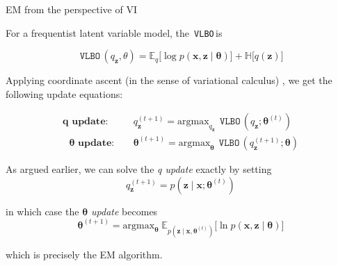 \documentclass[10pt]{beamer}
\newcommand{\+}[1]{\ensuremath{{\boldsymbol #1}}} %
\newcommand{\cond}{\; | \;}
\newcommand{\E}{\mathbb{E}}
\newcommand{\VLBO}{\,\texttt{VLBO}\,}
\begin{document}
\begin{frame}{EM from the perspective of VI}

 
 
For a frequentist latent variable model, the \VLBO is 

\begin{equation*} 
\VLBO(q_\+z, \theta) = \E_q \big[ \log p(\+x, \+z \cond \+\theta) \big]  +  \mathbb{H} \big[q(\+z) \big]  %
\end{equation*}


 

Applying coordinate ascent \tiny (in the sense of variational calculus) \normalsize ,  we get the following update equations: 

\begin{align}
\textbf{q update}: \quad & q_{\+z}^{(t+1)} = \text{argmax}_{q_\+z} \; \VLBO (q_\+z ; \+\theta^{(t)} ) \label{q_update} \\
\textbf{ $\+\theta$ update}: \quad & \+\theta^{(t+1)} = \text{argmax}_{\+\theta} \; \VLBO (q_{\+z}^{(t+1)} ; \+\theta )\label{theta_update} 
\end{align} 

 
As argued earlier, we can solve the \textit{q update} exactly by setting   
\[ q_{\+z}^{(t+1)} =   p(\+z \cond \+x; \+\theta^{(t)})\]  

 
in which case the \textit{ $\+\theta$ update} becomes
\begin{equation}
 \+\theta^{(t+1)} =  \text{argmax}_{\+\theta} \; \E_{p(\+z \cond \+x , \+\theta^{(t)})} \bigg[ \ln p(\+x, \+z \cond \+\theta) \bigg] \label{EM}
\end{equation}
 
which is precisely the EM algorithm. 


\end{frame}
\end{document}
